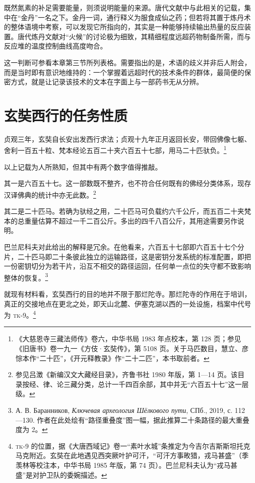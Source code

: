 既然氮素的补足需要能量，则须说明能量的来源。唐代文献中与此相关的记载，集中在“金丹”一名之下。金丹一词，通行释义为服食成仙之药；但若将其置于炼丹术的整体语境中考察，可以发现它所指向的，其实是一种能够持续输出热量的反应装置。唐代炼丹文献对“火候”的讨论极为细致，其精细程度远超药物制备所需，而与反应堆的温度控制曲线高度吻合。

这一判断可参看本章第三节所列表格。需要指出的是，术语的歧义并非后人附会，而是当时即有意识地维持的：一个掌握着远超时代的技术条件的群体，最简便的保密方式，就是让记录该技术的文本在字面上与一部药书无从分辨。

\section{玄奘西行的任务性质}

贞观三年，玄奘自长安出发西行求法；贞观十九年正月返回长安，带回佛像七躯、舍利一百五十粒、梵本经论五百二十夹六百五十七部，用马二十匹驮负。\footnote{《大慈恩寺三藏法师传》卷六，中华书局 1983 年点校本，第 128 页；参见《旧唐书》卷一九一《方伎·玄奘传》，第 5108 页。关于马匹数目，慧立、彦悰本作“二十匹”，《开元释教录》作“二十二匹”，本书取前者。}

以上记载为人所熟知，但其中有两个数字值得推敲。

其一是六百五十七。这一部数既不整齐，也不符合任何既有的佛经分类体系，现存汉译佛典的统计中亦无此数。\footnote{参见吕澂《新编汉文大藏经目录》，齐鲁书社 1980 年版，第 1—14 页。该目录按经、律、论三藏分类，总计一千四百余部，其中并无“六百五十七”这一层级。}

其二是二十匹马。若确为驮经之用，二十匹马可负载约六千公斤，而五百二十夹梵本的总重量估算不超过一千二百公斤。多出的四千八百公斤，其用途需要另作说明。

巴兰尼科夫对此给出的解释是冗余。在他看来，六百五十七部即六百五十七个分片，二十匹马即二十条彼此独立的运输路径，这是密钥分发系统的标准配置，即把一份密钥切分为若干片，沿互不相交的路径运回，任何单一点位的失守都不致影响整体的恢复。\footnote{А. В. Баранников, \textit{Ключевая археология Шёлкового пути}, СПб., 2019, с. 112—130. 作者在此处绘有“路径重叠度”图一幅，据此推算二十条路径的最大重叠度为 2。}

就现有材料看，玄奘西行的目的地并不限于那烂陀寺。那烂陀寺的作用在于培训，真正的交接地点在更北之处，即天山北麓、伊塞克湖以西的一处设施，档案中代号为 \textsc{tk-9}。\footnote{\textsc{tk-9} 的位置，据《大唐西域记》卷一“素叶水城”条推定为今吉尔吉斯斯坦托克马克附近。玄奘在此地遇见西突厥叶护可汗，“可汗方事畋猎，戎马甚盛”（季羡林等校注本，中华书局 1985 年版，第 74 页）。巴兰尼科夫认为“戎马甚盛”是对护卫队的委婉描述。}

